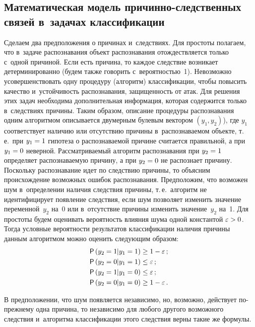 \begin{multicols}{2}
  \section{Математическая модель причинно-следственных связей 
в~задачах классификации}
  
  Сделаем два предположения о причинах и~следствиях. Для простоты полагаем, 
что в~задаче распознавания объект распознавания отождествляется только с~одной 
причиной. Если есть причина, то каждое следствие возникает детерминированно 
(будем также говорить с~вероятностью~1). Невозможно усовершенствовать одну 
процедуру (алгоритм) классификации, чтобы повысить качество и~устойчивость 
распознавания, защищенность от атак. Для решения этих задач необходима 
дополнительная информация, которая содержится только в~следствиях причины. 
Таким образом, описание процедуры распознавания одним алгоритмом 
описывается двумерным булевым вектором $(y_1,y_2)$), где $y_1$ соответствует 
наличию или отсутствию причины в~распознаваемом объекте, т.\,е.\  при 
$y_1\hm=1$ гипотеза о распознаваемой причине считается правильной, а при 
$y_1\hm=0$ неверной. Рассматриваемый алгоритм распознавания при $y_2\hm=1$ 
определяет распознаваемую причину, а при $y_2\hm=0$ не распознает причину. 
Поскольку распознавание идет по следствию причины, то объясним 
происхождение возможных ошибок распознавания. Предположим, что возможен 
шум в~определении наличия следствия причины, т.\,е.\ алгоритм не 
идентифицирует появление следствия, если шум позволяет изменить значение 
переменной~$y_2$ на~0 или в~отсутствие причины изменить значение~$y_2$ на~1. 
Для простоты будем оценивать вероятность влияния шума одной 
константой $\varepsilon \hm>0$. Тогда условные вероятности результатов 
классификации наличия причины данным алгоритмом можно оценить 
следующим образом:
  \begin{align*}
  {\sf P}\left( y_2=1\vert y_1=1\right) &\geq 1-\varepsilon\,;\\
{\sf  P}\left( y_2=0\vert y_1=1\right) &\leq \varepsilon\,;\\
{\sf  P}\left( y_2=1\vert y_1=0\right) &\leq \varepsilon\,;\\
{\sf  P}\left( y_2=0\vert y_1=0\right) &\geq 1-\varepsilon\,.
  \end{align*}
  
  В предположении, что шум появляется независимо, но, возможно, действует  
по-преж\-не\-му одна причина, то независимо для любого другого возможного 
следствия и~алгоритма классификации этого следствия верны такие же формулы. 
  

\end{multicols}

